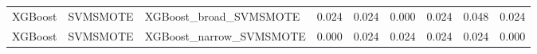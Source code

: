 \begin{tabular}{lllllllll}
                     XGBoost &            SVMSMOTE &                       XGBoost\_broad\_SVMSMOTE & 0.024 &                     0.024 &                 0.000 &                  0.024 &                                   0.048 &     0.024 \\
                     XGBoost &            SVMSMOTE &                      XGBoost\_narrow\_SVMSMOTE & 0.000 &                     0.024 &                 0.024 &                  0.024 &                                   0.024 &     0.000 \\
\bottomrule
\end{tabular}
